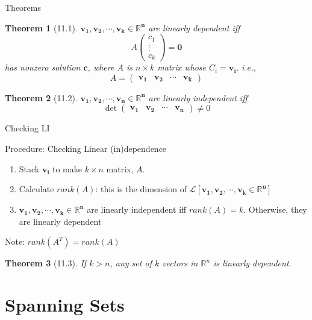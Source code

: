 \documentclass[final]{beamer}
\newtheorem{thm}{Theorem}
\begin{document}
\begin{frame}[t]{Theorems}
	\begin{thm}
		[11.1] $\mathbf{v_1,v_2,\cdots,v_k\in\mathbb{R}^n}$ are linearly dependent iff\[
			A \begin{pmatrix}
				c_1 \\
				\vdots\\
				c_k
			\end{pmatrix} = \mathbf{0}
		\] has nonzero solution $\mathbf{c}$, where $A$ is $n\times k$ matrix whose $C_i = \mathbf{v_i}$. $i.e.,$\[
			A = \begin{pmatrix}
				\mathbf{v_1} & \mathbf{v_2} & \cdots & \mathbf{v_k}
			\end{pmatrix}
		\]
	\end{thm}
	\begin{thm}
		[11.2] $\mathbf{v_1,v_2,\cdots,v_n\in\mathbb{R}^n}$ are linearly independent iff \[
			\det\begin{pmatrix}
				\mathbf{v_1} & \mathbf{v_2} & \cdots & \mathbf{v_n}
			\end{pmatrix} \neq 0
		\]
	\end{thm}

\end{frame}

\begin{frame}[t]{Checking LI}
	\begin{block}
		{Procedure: Checking Linear (in)dependence}
		\begin{enumerate}
			\item Stack $\mathbf{v_i}$ to make $k\times n$ matrix, $A$. 
			\item Calculate $rank(A)$: this is the dimension of $\mathcal{L}[\mathbf{v_1,v_2,\cdots,v_k\in\mathbb{R}^n}]$
			\item $\mathbf{v_1,v_2,\cdots,v_k\in\mathbb{R}^n}$ are linearly independent iff $rank(A)=k$. Otherwise, they are linearly dependent
		\end{enumerate}
	\end{block}
	Note: $rank(A^T) = rank(A)$
	\begin{thm}
		[11.3] If $k>n$, any set of $k$ vectors in $\mathbb{R}^n$ is linearly dependent.
	\end{thm}
\end{frame}

\section{Spanning Sets} %
\label{sec:spanning_sets}
\end{document}
